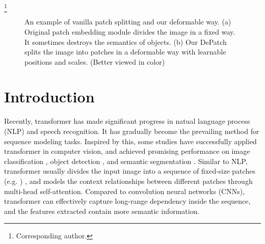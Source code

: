 \documentclass[sigconf,screen]{acmart}
\newcommand\blfootnote[1]{\begingroup
  \renewcommand\thefootnote{}\footnote{#1}\addtocounter{footnote}{-1}\endgroup
}
\begin{document}


\maketitle
\blfootnote{ Corresponding author.}

\begin{figure}[h]
  \caption{An example of vanilla patch splitting and our deformable way. (a) Original patch embedding module divides the image in a fixed way. It sometimes destroys the semantics of objects. (b) Our DePatch splits the image into patches in a deformable way with learnable positions and scales. (Better viewed in color)}
  \label{fig:introduction}
\end{figure}

\section{Introduction}

Recently, transformer \cite{transformer} has made significant progress in natual language process (NLP) and speech recognition. It has gradually become the prevailing method for sequence modeling tasks. Inspired by this, some studies have successfully applied transformer in computer vision, and achieved promising performance on image classification \cite{deit,swin}, object detection \cite{detr, deformabledetr}, and semantic segmentation \cite{setr}. Similar to NLP, transformer usually divides the input image into a sequence of fixed-size patches (e.g. ) \cite{vit,deit,pvt,t2tvit}, and models the context relationships between different patches through multi-head self-attention. Compared to convolution neural networks (CNNs), transformer can effectively capture long-range dependency inside the sequence, and the features extracted contain more semantic information.
\end{document}
